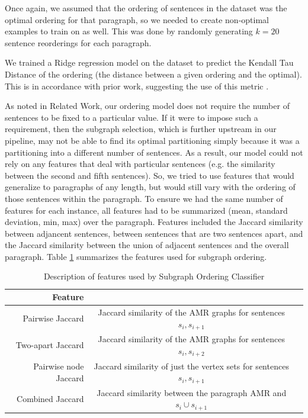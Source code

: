 \documentclass[12pt]{article}
\begin{document}
Once again, we assumed that the ordering of sentences in the dataset was the
optimal ordering for that paragraph, so we needed to create non-optimal
examples to train on as well. This was done by randomly generating
$k=20$ sentence reorderings for each paragraph.

We trained a Ridge regression model on the dataset to predict the Kendall Tau Distance of the ordering
(the distance between a given ordering and the optimal). This is in accordance with prior work, suggesting
the use of this metric \cite{lapata2006automatic}.

As noted in Related Work, our ordering model does not require the number of
sentences to be fixed to a particular value. If it were to impose such a
requirement, then the subgraph selection, which is further upstream in our
pipeline, may not be able to find its optimal partitioning simply because it
was a partitioning into a different number of sentences. As a result, our model
could not rely on any features that deal with particular sentences (e.g. the
similarity between the second and fifth sentences). So, we tried to use
features that would generalize to paragraphs of any length, but would still
vary with the ordering of those sentences within the paragraph. To ensure we 
had the same number of features for each instance, all features had to be summarized (mean, standard deviation, min, max) over the
paragraph. Features included the Jaccard similarity between adjancent
sentences, between sentences that are two sentences apart, and the Jaccard
similarity between the union of adjacent sentences and the overall paragraph.
Table \ref{tab:order_features} summarizes the features used for subgraph ordering.

\begin{table}
\centering
\label{tab:order_features}
\begin{tabular}{|r|c|c|}
\hline
Feature & \\ \hline\hline
Pairwise Jaccard & Jaccard similarity of the AMR graphs for sentences $s_i,s_{i+1}$ \\ \hline
Two-apart Jaccard & Jaccard similarity of the AMR graphs for sentences $s_i,s_{i+2}$ \\ \hline
Pairwise node Jaccard & Jaccard similarity of just the vertex sets for sentences $s_i,s_{i+1}$ \\ \hline
Combined Jaccard & Jaccard similarity between the paragraph AMR and $s_i \cup
s_{i+1}$ \\ \hline
\end{tabular}
\caption{Description of features used by Subgraph Ordering Classifier}
\end{table}
\end{document}
